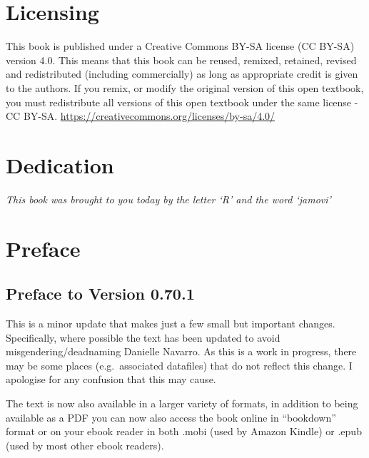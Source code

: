 \documentclass[
]{book}
\begin{document}
\hypertarget{licensing}{%
\chapter*{Licensing}\label{licensing}}

This book is published under a Creative Commons BY-SA license (CC BY-SA) version 4.0. This means that this book can be reused, remixed, retained, revised and redistributed (including commercially) as long as appropriate credit is given to the authors. If you remix, or modify the original version of this open textbook, you must redistribute all versions of this open textbook under the same license - CC BY-SA. \url{https://creativecommons.org/licenses/by-sa/4.0/}

\hypertarget{dedication}{%
\chapter*{Dedication}\label{dedication}}

\emph{This book was brought to you today by the letter `R' and the word `jamovi'}

\hypertarget{preface}{%
\chapter*{Preface}\label{preface}}

\hypertarget{preface-to-version-0.70.1}{%
\section*{Preface to Version 0.70.1}\label{preface-to-version-0.70.1}}

This is a minor update that makes just a few small but important changes. Specifically,
where possible the text has been updated to avoid misgendering/deadnaming Danielle Navarro. As this is a work in progress, there may be some places (e.g.~associated datafiles) that do not reflect this change. I apologise for any confusion that this may cause.

The text is now also available in a larger variety of formats, in addition to being available as a PDF you can now also access the book online in ``bookdown'' format or on your ebook reader in both .mobi (used by Amazon Kindle) or .epub (used by most other ebook readers).
\end{document}
